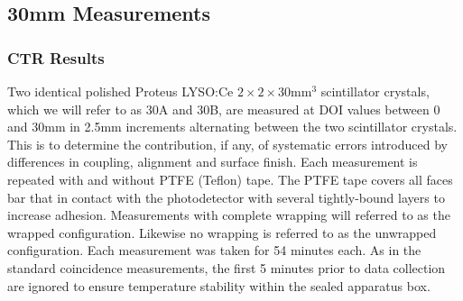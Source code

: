 \subsection{30mm Measurements}
\label{sec:30mm}
\subsubsection{CTR Results}
Two identical polished Proteus LYSO:Ce $2\times2\times30$mm$^3$ scintillator crystals, which we will refer to as 30A and 30B, are measured at DOI values between 0 and 30mm in 2.5mm increments alternating between the two scintillator crystals. This is to determine the contribution, if any, of systematic errors introduced by differences in coupling, alignment and surface finish. Each measurement is repeated with and without PTFE (Teflon) tape. The PTFE tape covers all faces bar that in contact with the photodetector with several tightly-bound layers to increase adhesion. Measurements with complete wrapping will referred to as the wrapped configuration. Likewise no wrapping is referred to as the unwrapped configuration. Each measurement was taken for 54 minutes each. As in the standard coincidence measurements, the first 5 minutes prior to data collection are ignored to ensure temperature stability within the sealed apparatus box.

